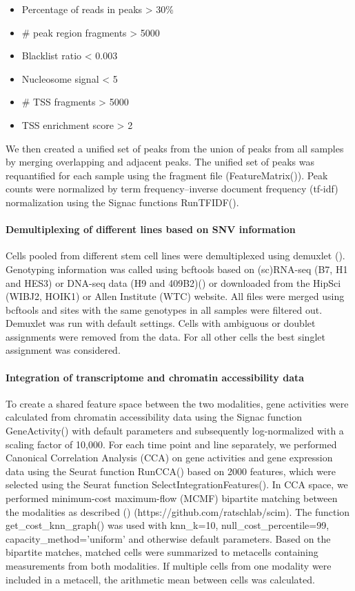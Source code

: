 \begin{itemize}
\item Percentage of reads in peaks > 30\%
\item \# peak region fragments > 5000
\item Blacklist ratio < 0.003
\item Nucleosome signal < 5
\item \# TSS fragments > 5000
\item TSS enrichment score > 2
\end{itemize} 

We then created a unified set of peaks from the union of peaks from all samples by merging overlapping and adjacent peaks. The unified set of peaks was requantified for each sample using the fragment file (FeatureMatrix()). Peak counts were normalized by term frequency–inverse document frequency (tf-idf) normalization using the Signac functions RunTFIDF().
 
\paragraph{Demultiplexing of different lines based on SNV information}
Cells pooled from different stem cell lines were demultiplexed using demuxlet (\cite{kang_multiplexed_2018}). Genotyping information was called using bcftools based on (sc)RNA-seq (B7, H1 and HES3) or DNA-seq data (H9 and 409B2)(\cite{riesenberg_simultaneous_2019,kanton_organoid_2019}) or downloaded from the HipSci (WIBJ2, HOIK1) or Allen Institute (WTC) website. All files were merged using bcftools and sites with the same genotypes in all samples were filtered out. Demuxlet was run with default settings. Cells with ambiguous or doublet assignments were removed from the data. For all other cells the best singlet assignment was considered.
 
\paragraph{Integration of transcriptome and chromatin accessibility data}
To create a shared feature space between the two modalities, gene activities were calculated from chromatin accessibility data using the Signac function GeneActivity() with default parameters and subsequently log-normalized with a scaling factor of 10,000. For each time point and line separately, we performed Canonical Correlation Analysis (CCA) on gene activities and gene expression data using the Seurat function RunCCA() based on 2000 features, which were selected using the Seurat function SelectIntegrationFeatures(). In CCA space, we performed minimum-cost maximum-flow (MCMF) bipartite matching between the modalities as described (\cite{stark_scim_2020}) (https://github.com/ratschlab/scim). The function get\_cost\_knn\_graph() was used with knn\_k=10, null\_cost\_percentile=99, capacity\_method=’uniform’ and otherwise default parameters. Based on the bipartite matches, matched cells were summarized to metacells containing measurements from both modalities. If multiple cells from one modality were included in a metacell, the arithmetic mean between cells was calculated.
 
